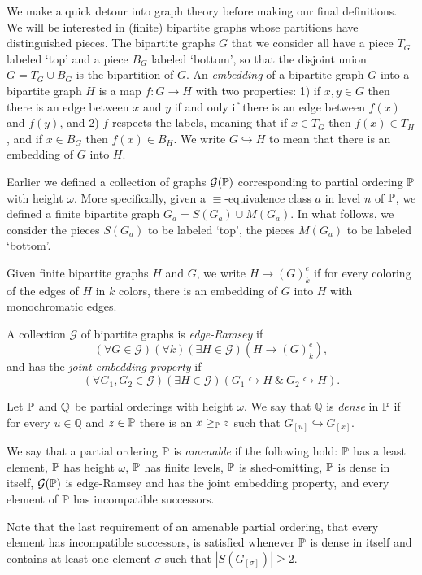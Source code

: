 We make a quick detour into graph theory before making our final definitions.
We will be interested in (finite) bipartite graphs whose partitions
have distinguished pieces.
The bipartite graphs $G$ that we consider all have a piece $T_G$ labeled `top'
and a piece $B_G$ labeled `bottom', so that the disjoint union $G=T_G\cup B_G$
is the bipartition of $G$.
An \textit{embedding} of a bipartite graph $G$ into a bipartite graph $H$
is a map $f:G\to H$ with two properties:
1) if $x,y\in G$ then there is an edge between $x$ and $y$ if and only if
there is an edge between $f(x)$ and $f(y)$, and 2) $f$ respects the labels,
meaning that if $x\in T_G$ then $f(x)\in T_H$, and if $x\in B_G$ then $f(x)\in B_H$.
We write $G\hookrightarrow H$ to mean that there is an embedding of $G$ into $H$.

Earlier we defined a collection of graphs $\mathcal{G}(\mathbb{P})$ corresponding
to partial ordering $\mathbb{P}$ with height $\omega$.
More specifically, given a $\equiv$-equivalence class $a$ in level $n$ of $\mathbb{P}$,
we defined a finite bipartite graph $G_{a}=S(G_a)\cup M(G_a)$.
In what follows, we consider the pieces $S(G_a)$ to be labeled `top',
the pieces $M(G_a)$ to be labeled `bottom'.

\begin{definition}
Given finite bipartite graphs $H$ and $G$, we write $H\rightarrow (G)^e_k$
if for every coloring of the edges of $H$ in $k$ colors,
there is an embedding of $G$ into $H$ with monochromatic edges.

A collection $\mathcal{G}$ of bipartite graphs is \textit{edge-Ramsey} if
$$(\forall G\in\mathcal{G})(\forall k)(\exists H\in\mathcal{G})(H\rightarrow (G)^e_k),$$
and has the \textit{joint embedding property} if
$$(\forall G_1,G_2\in\mathcal{G})(\exists H\in\mathcal{G})(G_1\hookrightarrow H \ \& \ G_2\hookrightarrow H).$$
\end{definition}

\begin{definition}
Let $\mathbb{P}$ and $\mathbb{Q}$ be partial orderings with height $\omega$.
We say that $\mathbb{Q}$ is \textit{dense} in $\mathbb{P}$ if for every $u\in\mathbb{Q}$ and $z\in\mathbb{P}$
there is an $x\geq_{\mathbb{P}} z$ such that $G_{[u]}\hookrightarrow G_{[x]}$.
\end{definition}

\begin{definition}\label{D:amenable}
We say that a partial ordering $\mathbb{P}$ is \textit{amenable} if the following hold:
$\mathbb{P}$ has a least element, $\mathbb{P}$ has height $\omega$, $\mathbb{P}$ has finite levels,
$\mathbb{P}$ is shed-omitting, $\mathbb{P}$ is dense in itself,
$\mathcal{G}(\mathbb{P})$ is edge-Ramsey and has the joint embedding property,
and every element of $\mathbb{P}$ has incompatible successors.
\end{definition}
Note that the last requirement of an amenable partial ordering,
that every element has incompatible successors, is satisfied
whenever $\mathbb{P}$ is dense in itself and contains at least one element $\sigma$
such that $|S(G_{[\sigma]})|\geq 2$.

